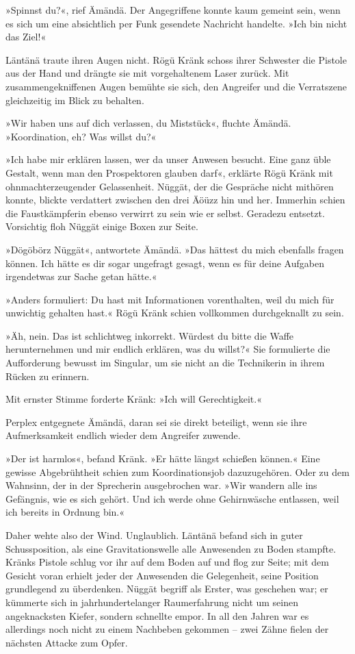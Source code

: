 »Spinnst du?«, rief Ämändä. Der Angegriffene konnte kaum gemeint sein, wenn es sich um eine absichtlich per Funk gesendete Nachricht handelte. »Ich bin nicht das Ziel!«

Läntänä traute ihren Augen nicht. Rögü Kränk schoss ihrer Schwester die Pistole aus der Hand und drängte sie mit vorgehaltenem Laser zurück. Mit zusammengekniffenen Augen bemühte sie sich, den Angreifer und die Verratszene gleichzeitig im Blick zu behalten.

»Wir haben uns auf dich verlassen, du Miststück«, fluchte Ämändä. »Koordination, eh? Was willst du?«

»Ich habe mir erklären lassen, wer da unser Anwesen besucht. Eine ganz üble Gestalt, wenn man den Prospektoren glauben darf«, erklärte Rögü Kränk mit ohnmachterzeugender Gelassenheit. Nüggät, der die Gespräche nicht mithören konnte, blickte verdattert zwischen den drei Äöüzz hin und her. Immerhin schien die Faustkämpferin ebenso verwirrt zu sein wie er selbst. Geradezu entsetzt. Vorsichtig floh Nüggät einige Boxen zur Seite.

»Dögöbörz Nüggät«, antwortete Ämändä. »Das hättest du mich ebenfalls fragen können. Ich hätte es dir sogar ungefragt gesagt, wenn es für deine Aufgaben irgendetwas zur Sache getan hätte.«

»Anders formuliert: Du hast mit Informationen vorenthalten, weil du mich für unwichtig gehalten hast.« Rögü Kränk schien vollkommen durchgeknallt zu sein.

»Äh, nein. Das ist schlichtweg inkorrekt. Würdest du bitte die Waffe herunternehmen und mir endlich erklären, was du willst?« Sie formulierte die Aufforderung bewusst im Singular, um sie nicht an die Technikerin in ihrem Rücken zu erinnern.

Mit ernster Stimme forderte Kränk: »Ich will Gerechtigkeit.«

Perplex entgegnete Ämändä, daran sei sie direkt beteiligt, wenn sie ihre Aufmerksamkeit endlich wieder dem Angreifer zuwende.

»Der ist harmlos«, befand Kränk. »Er hätte längst schießen können.« Eine gewisse Abgebrühtheit schien zum Koordinationsjob dazuzugehören. Oder zu dem Wahnsinn, der in der Sprecherin ausgebrochen war. »Wir wandern alle ins Gefängnis, wie es sich gehört. Und ich werde ohne Gehirnwäsche entlassen, weil ich bereits in Ordnung bin.«

Daher wehte also der Wind. Unglaublich. Läntänä befand sich in guter Schussposition, als eine Gravitationswelle alle Anwesenden zu Boden stampfte. Kränks Pistole schlug vor ihr auf dem Boden auf und flog zur Seite; mit dem Gesicht voran erhielt jeder der Anwesenden die Gelegenheit, seine Position grundlegend zu überdenken. Nüggät begriff als Erster, was geschehen war; er kümmerte sich in jahrhundertelanger Raumerfahrung nicht um seinen angeknacksten Kiefer, sondern schnellte empor. In all den Jahren war es allerdings noch nicht zu einem Nachbeben gekommen – zwei Zähne fielen der nächsten Attacke zum Opfer.

